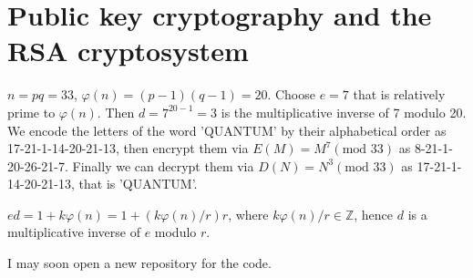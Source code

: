 \chapter{Public key cryptography and the RSA cryptosystem}

\ex $n=pq=33$, $\varphi(n)=(p-1)(q-1)=20$.
Choose $e=7$ that is relatively prime to $\varphi(n)$.
Then $d=7^{20-1}=3$ is the multiplicative inverse of 7 modulo 20.
We encode the letters of the word 'QUANTUM' by their alphabetical order as 17-21-1-14-20-21-13, then encrypt them via $E(M)=M^7(\text{mod }33)$ as 8-21-1-20-26-21-7.
Finally we can decrypt them via $D(N)=N^3(\text{mod }33)$ as 17-21-1-14-20-21-13, that is 'QUANTUM'.

\ex $ed=1+k\varphi(n)=1+(k\varphi(n)/r)r$, where $k\varphi(n)/r\in\mathbb{Z}$, hence $d$ is a multiplicative inverse of $e$ modulo $r$.

\prob \redstar I may soon open a new repository for the code.